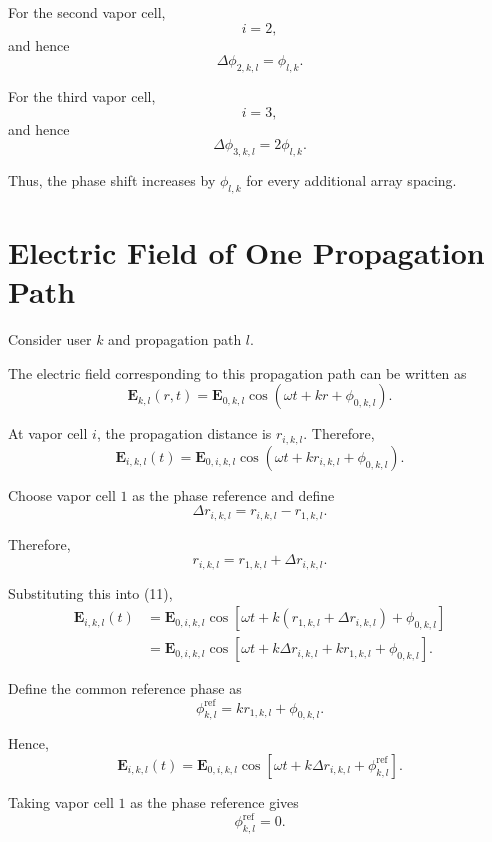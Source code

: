 \documentclass[12pt,a4paper]{article}
\begin{document}
For the second vapor cell,
\[
i=2,
\]
and hence
\[
\Delta\phi_{2,k,l}=\phi_{l,k}.
\]

For the third vapor cell,
\[
i=3,
\]
and hence
\[
\Delta\phi_{3,k,l}=2\phi_{l,k}.
\]

Thus, the phase shift increases by \(\phi_{l,k}\) for every
additional array spacing.

\section{Electric Field of One Propagation Path}

Consider user \(k\) and propagation path \(l\).

The electric field corresponding to this propagation path can be
written as
\begin{equation}
\mathbf E_{k,l}(r,t)
=
\mathbf E_{0,k,l}
\cos
\left(
\omega t+kr+\phi_{0,k,l}
\right).
\tag{10}
\end{equation}

At vapor cell \(i\), the propagation distance is
\(r_{i,k,l}\). Therefore,
\begin{equation}
\mathbf E_{i,k,l}(t)
=
\mathbf E_{0,i,k,l}
\cos
\left(
\omega t
+
kr_{i,k,l}
+
\phi_{0,k,l}
\right).
\tag{11}
\end{equation}

Choose vapor cell \(1\) as the phase reference and define
\[
\Delta r_{i,k,l}
=
r_{i,k,l}-r_{1,k,l}.
\]

Therefore,
\[
r_{i,k,l}
=
r_{1,k,l}
+
\Delta r_{i,k,l}.
\]

Substituting this into (11),
\[
\begin{aligned}
\mathbf E_{i,k,l}(t)
&=
\mathbf E_{0,i,k,l}
\cos
\left[
\omega t
+
k
\left(
r_{1,k,l}+\Delta r_{i,k,l}
\right)
+
\phi_{0,k,l}
\right]\\
&=
\mathbf E_{0,i,k,l}
\cos
\left[
\omega t
+
k\Delta r_{i,k,l}
+
kr_{1,k,l}
+
\phi_{0,k,l}
\right].
\end{aligned}
\]

Define the common reference phase as
\[
\phi_{k,l}^{\mathrm{ref}}
=
kr_{1,k,l}
+
\phi_{0,k,l}.
\]

Hence,
\[
\mathbf E_{i,k,l}(t)
=
\mathbf E_{0,i,k,l}
\cos
\left[
\omega t
+
k\Delta r_{i,k,l}
+
\phi_{k,l}^{\mathrm{ref}}
\right].
\]

Taking vapor cell \(1\) as the phase reference gives
\[
\phi_{k,l}^{\mathrm{ref}}=0.
\]
\end{document}
